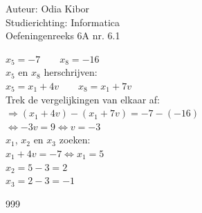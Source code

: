 \documentclass[a4paper]{article}
\begin{document}
  
\noindent \large Auteur: Odia Kibor \\
\noindent \large Studierichting: Informatica\\
\noindent \large Oefeningenreeks 6A nr. 6.1
\\

\medskip

\normalsize


$x_5 = -7 \qquad x_8 = -16$\\

$x_5$ en $x_8$ herschrijven:\\

$x_5 = x_1 + 4v \qquad x_8 = x_1 + 7v$\\

Trek de vergelijkingen van elkaar af:\\

$\Rightarrow (x_1 + 4v ) - (x_1 + 7v) = -7 - (- 16)$\\

$\Leftrightarrow -3v = 9 \Leftrightarrow v = -3$\\

$x_1$, $x_2$ en $x_3$ zoeken:\\

$x_1 + 4v = -7 \Leftrightarrow x_1 = 5$\\

$x_2 = 5 - 3 = 2$\\

$x_3 = 2 - 3 = -1$\\




















\begin{thebibliography}{999}
\end{thebibliography}
\end{document}
